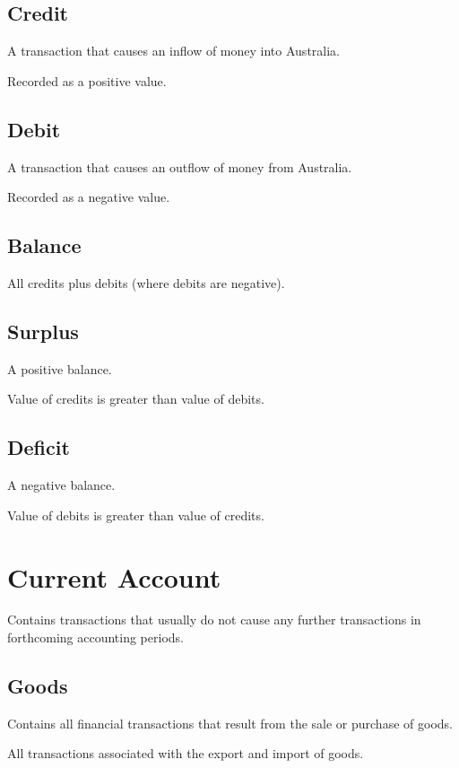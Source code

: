 \documentclass[a4paper,11pt]{report}
\begin{document}
\subsection{Credit}

A transaction that causes an inflow of money into Australia.

Recorded as a positive value.

\subsection{Debit}

A transaction that causes an outflow of money from Australia.

Recorded as a negative value.

\subsection{Balance}

All credits plus debits (where debits are negative).

\subsection{Surplus}

A positive balance.

Value of credits is greater than value of debits.

\subsection{Deficit}

A negative balance.

Value of debits is greater than value of credits.


\section{Current Account}

Contains transactions that usually do not cause any further transactions in
forthcoming accounting periods.

\subsection{Goods}

Contains all financial transactions that result from the sale or purchase of
goods.

All transactions associated with the export and import of goods.
\end{document}
